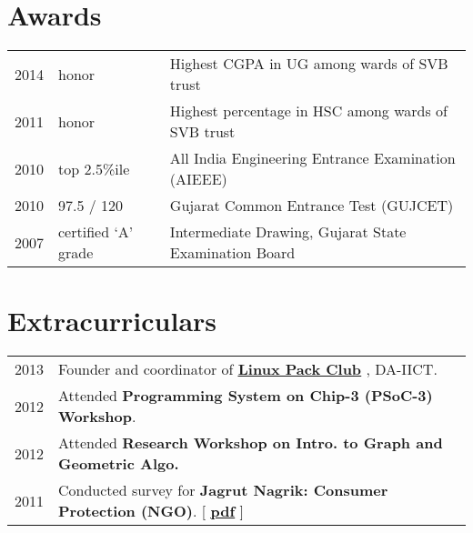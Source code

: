 \documentclass[]{deedy}
\newcommand{\linkstyle}[1]{\textbf{\ul{#1}}}
\let\oldhref\href
\renewcommand{\href}[2]{%
\oldhref{#1}{\linkstyle{#2}}%
}
\begin{document}
\begin{minipage}[t]{0.66\textwidth}
\section{Awards}
\begin{tabular}{rll}
2014 & honor & Highest CGPA in UG among wards of SVB trust\\
2011 & honor & Highest percentage in HSC among wards of SVB trust\\
2010 & top 2.5\%ile & All India Engineering Entrance Examination (AIEEE)\\
2010 & 97.5 / 120 & Gujarat Common Entrance Test (GUJCET)\\
2007 & certified `A' grade & Intermediate Drawing, Gujarat State Examination Board\\
\end{tabular}

\section{Extracurriculars}
\vspace{\topsep} %
\begin{tabular}{ll}
2013 & Founder and coordinator of  \href{http://lpdaiict.wordpress.com/}{\textbf{Linux Pack Club}}, DA-IICT.\\
2012 & Attended \textbf{Programming System on Chip-3 (PSoC-3) Workshop}.\\
2012 & Attended \textbf{Research Workshop on Intro. to Graph and Geometric Algo.}\\
2011 & Conducted survey for \textbf{Jagrut Nagrik: Consumer Protection (NGO)}. [ \href{https://dl.dropboxusercontent.com/u/9020146/resources/reports/rural_internship.pdf}{pdf} ]\\
\end{tabular}

\end{minipage}
\end{document}
